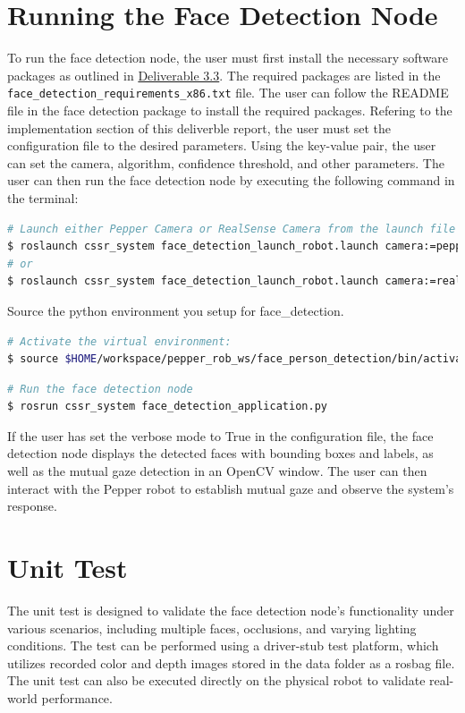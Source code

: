 \documentclass{CSSRforAfrica}
\begin{document}
{\newpage
\section{Running the Face Detection Node}
To run the face detection node, the user must first install the necessary software packages as outlined in 
\href{https://cssr4africa.github.io/deliverables/CSSR4Africa_Deliverable_D3.3.pdf}{Deliverable 3.3}. The required packages
are listed in the \texttt{face\_detection\_requirements\_x86.txt} file. The user can follow the README file in the face detection
package to install the required packages. Refering to the implementation section of this deliverble report, the user must 
set the configuration file to the desired parameters. Using the key-value pair, the user can set the camera, algorithm, 
confidence threshold, and other parameters. The user can then run the face detection node by executing the following 
command in the terminal:

\begin{lstlisting}[style=withoutNumbering, language=bash]
# Launch either Pepper Camera or RealSense Camera from the launch file 
$ roslaunch cssr_system face_detection_launch_robot.launch camera:=pepper
# or
$ roslaunch cssr_system face_detection_launch_robot.launch camera:=realsense
\end{lstlisting}

Source the python environment you setup for face\_detection. 
\begin{lstlisting}[style=withoutNumbering, language=bash]
# Activate the virtual environment:
$ source $HOME/workspace/pepper_rob_ws/face_person_detection/bin/activate
\end{lstlisting}

\begin{lstlisting}[style=withoutNumbering, language=bash]
# Run the face detection node
$ rosrun cssr_system face_detection_application.py
\end{lstlisting}


If the user has set the verbose mode to True in the configuration file, the face detection node displays the detected 
faces with bounding boxes and labels, as well as the mutual gaze detection in an OpenCV window. The user can then interact 
	with the Pepper robot to establish mutual gaze and observe the system's response.

\newpage

\section{Unit Test}
The unit test is designed to validate the face detection node's functionality under various scenarios, including multiple faces, occlusions, and varying lighting conditions. 
The test can be performed using a driver-stub test platform, which utilizes recorded color and depth images stored in the data folder as a rosbag file. The unit test can also 
be executed directly on the physical robot to validate real-world performance. 

}
\end{document}
